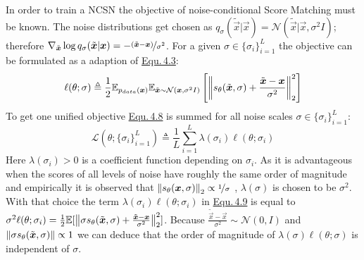 In order to train a NCSN the objective of noise-conditional Score Matching must be known. The noise distributions get chosen as $q_\sigma(\tilde{\vec{x}}|\vec{x})=\mathcal{N}(\tilde{\vec{x}}|\vec{x},\sigma^2I)$; therefore $\nabla_{\tilde{\vec{x}}}\log q_\sigma(\tilde{\vec{x}}|\vec{x})=-\nicefrac{(\tilde{\vec{x}}-\vec{x})}{\sigma^2}$. For a given $\sigma\in\{\sigma_i\}_{i=1}^L$ the objective can be formulated as a adaption of \hyperref[equ:4.3]{Equ.\,4.3}:
%
\begin{equation} \label{equ:4.8}
    \ell(\theta; \sigma)\triangleq\frac{1}{2}\mathbb{E}_{p_{data}(\vec{x})}\mathbb{E}_{\tilde{\vec{x}}\sim\mathcal{N}(\vec{x},\sigma^2I)}\left[\norm{s_\theta(\tilde{\vec{x}},\sigma)+\frac{\tilde{\vec{x}}-\vec{x}}{\sigma^2}}_2^2\right]
\end{equation}
% 
To get one unified objective \hyperref[equ:4.8]{Equ.\,4.8} is summed for all noise scales $\sigma\in\{\sigma_i\}_{i=1}^L$:
%
\begin{equation} \label{equ:4.9}
    \mathcal{L}(\theta;\{\sigma_i\}_{i=1}^L)\triangleq\frac{1}{L}\sum_{i=1}^L\lambda(\sigma_i)\ell(\theta;\sigma_i)
\end{equation}
%
Here $\lambda(\sigma_i)>0$ is a coefficient function depending on $\sigma_i$. As it is advantageous when the scores of all levels of noise have roughly the same order of magnitude and empirically it is observed that $\norm{s_\theta(\vec{x},\sigma)}_2\propto\nicefrac{1}{\sigma}$ \cite{score_2}, $\lambda(\sigma)$ is chosen to be $\sigma^2$. With that choice the term $\lambda(\sigma_i)\ell(\theta;\sigma_i)$ in \hyperref[equ:4.9]{Equ.\,4.9} is equal to $\sigma^2\ell(\theta;\sigma_i)=\frac{1}{2}\mathbb{E}[\norm{\sigma s_\theta(\tilde{\vec{x}},\sigma)+\frac{\tilde{\vec{x}}-\vec{x}}{\sigma^2}}_2^2]$. Because $\frac{\tilde{\vec{x}}-\vec{x}}{\sigma^2}\sim\mathcal{N}(0, I)$ and $\norm{\sigma s_\theta(\tilde{\vec{x}},\sigma)}\propto1$ we can deduce that the order of magnitude of $\lambda(\sigma)\ell(\theta;\sigma)$ is independent of $\sigma$.
%
